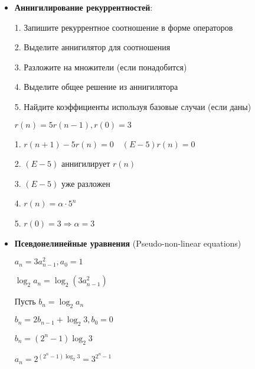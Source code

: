 \documentclass[12pt]{article}
\begin{document}
\begin{itemize}
\begin{minipage}{0.9\textwidth}
        \end{minipage}

        \vspace{4mm}

        \item \textbf{Аннигилирование рекуррентностей}:

        1. Запишите рекуррентное соотношение в форме операторов

        2. Выделите аннигилятор для соотношения

        3. Разложите на множители (если понадобится)

        4. Выделите общее решение из аннигилятора

        5. Найдите коэффициенты используя базовые случаи (если даны)

        \vspace{3mm}

        \Exs $r(n) = 5r(n - 1), r(0) = 3$

        1. $r(n + 1) - 5r(n) = 0 \quad (E - 5)r(n) = 0$

        2. $(E - 5)$ аннигилирует $r(n)$

        3. $(E - 5)$ уже разложен

        4. $r(n) = \alpha \cdot 5^n$

        5. $r(0) = 3 \Longrightarrow \alpha = 3$

        \item \textbf{Псевдонелинейные уравнения} (Pseudo-non-linear equations)

        \Exs $a_n = 3a_{n - 1}^2, a_0 = 1$

        $\log_2 a_n = \log_2 (3a_{n - 1}^2)$

        Пусть $b_n = \log_2 a_n$

        $b_n = 2b_{n - 1} + \log_2 3, b_0 = 0$

        $b_n = (2^n - 1)\log_2 3$

        $a_n = 2^{(2^n - 1)\log_2 3} = 3^{2^n - 1}$

    \end{itemize}
\end{document}
